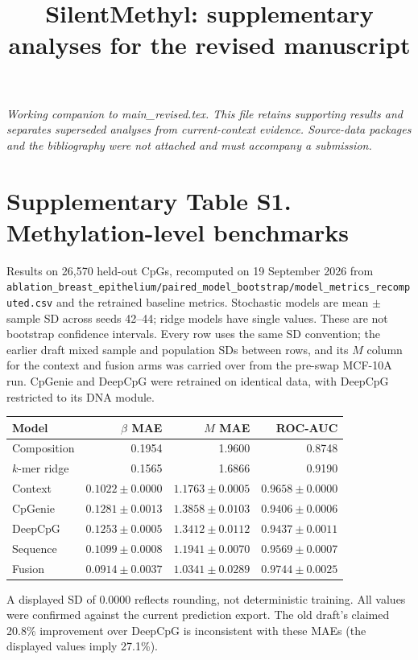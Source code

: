 \documentclass[10pt]{article}
\title{SilentMethyl: supplementary analyses for the revised manuscript}
\author{}\date{}
\begin{document}
\maketitle
\textit{Working companion to main\_revised.tex. This file retains supporting results and separates superseded analyses from current-context evidence. Source-data packages and the bibliography were not attached and must accompany a submission.}

\section*{Supplementary Table S1. Methylation-level benchmarks}
Results on 26,570 held-out CpGs, recomputed on 19 September 2026 from \texttt{ablation\_breast\_epithelium/paired\_model\_bootstrap/model\_metrics\_recomputed.csv} and the retrained baseline metrics. Stochastic models are mean $\pm$ sample SD across seeds 42--44; ridge models have single values. These are not bootstrap confidence intervals. Every row uses the same SD convention; the earlier draft mixed sample and population SDs between rows, and its $M$ column for the context and fusion arms was carried over from the pre-swap MCF-10A run. CpGenie and DeepCpG were retrained on identical data, with DeepCpG restricted to its DNA module.
\begin{center}\small
\begin{tabular}{lrrr}\toprule
Model & $\beta$ MAE & $M$ MAE & ROC-AUC\\\midrule
Composition & 0.1954 & 1.9600 & 0.8748\\
$k$-mer ridge & 0.1565 & 1.6866 & 0.9190\\
Context & $0.1022\pm0.0000$ & $1.1763\pm0.0005$ & $0.9658\pm0.0000$\\
CpGenie & $0.1281\pm0.0013$ & $1.3858\pm0.0103$ & $0.9406\pm0.0006$\\
DeepCpG & $0.1253\pm0.0005$ & $1.3412\pm0.0112$ & $0.9437\pm0.0011$\\
Sequence & $0.1099\pm0.0008$ & $1.1941\pm0.0070$ & $0.9569\pm0.0007$\\
Fusion & $0.0914\pm0.0037$ & $1.0341\pm0.0289$ & $0.9744\pm0.0025$\\\bottomrule
\end{tabular}\end{center}
A displayed SD of 0.0000 reflects rounding, not deterministic training. All values were confirmed against the current prediction export. The old draft's claimed 20.8\% improvement over DeepCpG is inconsistent with these MAEs (the displayed values imply 27.1\%).
\end{document}

